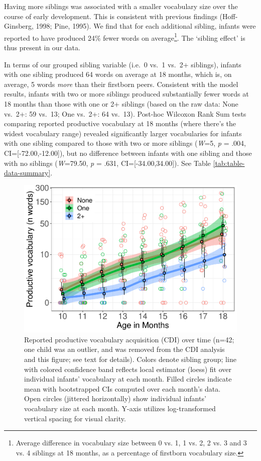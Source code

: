 \documentclass[
  man,mask,floatsintext]{apa6}
\begin{document}
Having more siblings was associated with a smaller vocabulary size over the course of early development. This is consistent with previous findings (Hoff-Ginsberg, 1998; Pine, 1995). We find that for each additional sibling, infants were reported to have produced 24\% fewer words on average\footnote{Average difference in vocabulary size between 0 vs. 1, 1 vs. 2, 2 vs. 3 and 3 vs. 4 siblings at 18 months, as a percentage of firstborn vocabulary size.}. The `sibling effect' is thus present in our data.

In terms of our grouped sibling variable (i.e.~0 vs.~1 vs.~2+ siblings), infants with one sibling produced 64 words on average at 18 months, which is, on average, 5 words \emph{more} than their firstborn peers. Consistent with the model results, infants with two or more siblings produced substantially fewer words at 18 months than those with one or 2+ siblings (based on the raw data: None vs.~2+: 59 vs.~13; One vs.~2+: 64 vs.~13). Post-hoc Wilcoxon Rank Sum tests comparing reported productive vocabulary at 18 months (where there's the widest vocabulary range) revealed significantly larger vocabularies for infants with one sibling compared to those with two or more siblings (\emph{W}=5, \emph{p} = .004, CI={[}-72.00,-12.00{]}), but no difference between infants with one sibling and those with no siblings (\emph{W}=79.50, \emph{p} = .631, CI={[}-34.00,34.00{]}). See Table \ref{tab:table-data-summary}.

\begin{figure}
\centering
\includegraphics{SiblingsStudyText-anon-revisions_files/figure-latex/Figure-SibGroup-1.pdf}
\caption{\label{fig:Figure-SibGroup}Reported productive vocabulary acquisition (CDI) over time (n=42; one child was an outlier, and was removed from the CDI analysis and this figure; see text for details). Colors denote sibling group; line with colored confidence band reflects local estimator (loess) fit over individual infants' vocabulary at each month. Filled circles indicate mean with bootstrapped CIs computed over each month's data. Open circles (jittered horizontally) show individual infants' vocabulary size at each month. Y-axis utilizes log-transformed vertical spacing for visual clarity.}
\end{figure}
\end{document}
